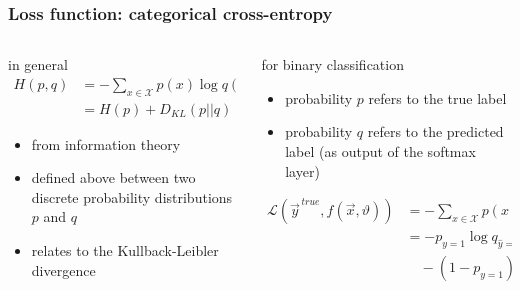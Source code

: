\documentclass[
  aspectratio=1610, %
  intlimits %
]{beamer}
\begin{document}
\begin{frame}
 \frametitle{Loss function: categorical cross-entropy}

 \begin{columns}
 \begin{column}{.49\textwidth}
 \begin{exampleblock}{in general}
   \begin{align*}
     H(p, q) &= - \sum_{x \in \mathcal{X}} p(x) \log q(x)\\
             &= H(p) + D_{KL}(p || q)
 \end{align*}
   \begin{itemize}
   \item from information theory
   \item defined above between two discrete probability distributions $p$ and $q$
   \item relates to the Kullback-Leibler divergence
   \end{itemize}
 \end{exampleblock}
\end{column}

 \begin{column}{.49\textwidth}
 \begin{exampleblock}{for binary classification}
   \begin{itemize}
   \item probability $p$ refers to the true label
   \item probability $q$ refers to the predicted label (as output of the softmax layer)
 \end{itemize}

   \begin{align*}
 \mathcal{L}( \vec{y}^{\,true}, f(\vec{x}, \vartheta)) &= - \sum_{x \in \mathcal{X}} p(x) \log q(x) \\
                                             &= - p_{y=1} \log q_{\hat{y}=1} \\
                                               &\quad - (1-p_{y=1}) \log (1-q_{\hat{y}=1})
   \end{align*}

\end{exampleblock}

\end{column}
\end{columns}


\end{frame}
\end{document}
